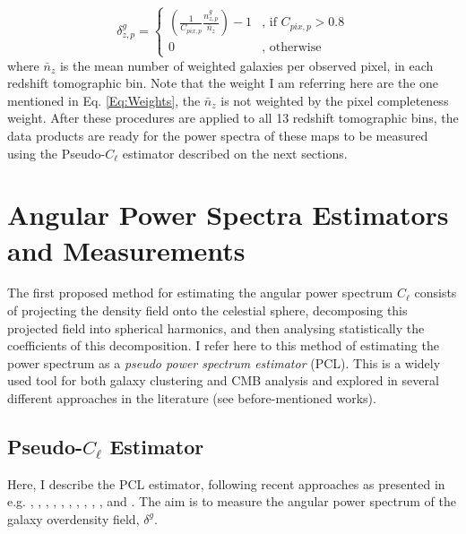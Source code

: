 \begin{equation}
\delta_{z,p}^g = 
\begin{cases}
\left(\frac{1}{C_{pix,p}}\frac{n^g_{z,p}}{\bar{n}_z}\right) - 1 & \text{, if } C_{pix,p} > 0.8 \\
0 & \text{, otherwise}
\end{cases}
\label{Eq:OverDMaps}
\end{equation}
where $\bar{n}_z$ is the mean number of weighted galaxies per observed pixel, in each redshift tomographic bin. Note that the weight I am referring here are the one mentioned in Eq. \ref{Eq:Weights}, the $\bar{n}_z$ is not weighted by the pixel completeness weight.  After these procedures are applied to all 13 redshift tomographic bins, the data products are ready for the power spectra of these maps to be measured using the Pseudo-$C_{\ell}$ estimator described on the next sections.

\section{Angular Power Spectra Estimators and Measurements}\label{Sec:Measurements}
The first proposed method for estimating the angular power spectrum $C_{\ell}$  \citep{Peebles1973} consists of projecting the density field onto the celestial sphere, decomposing this projected field into spherical harmonics, and then analysing statistically the coefficients of this decomposition. I refer here to this method of estimating the power spectrum as a \textit{pseudo power spectrum estimator} (PCL). This is a widely used tool for both galaxy clustering and CMB analysis and explored in several different approaches in the literature (see before-mentioned works).

\subsection{Pseudo-$C_{\ell}$ Estimator}\label{Ref:PCL}

Here, I describe the PCL estimator, following recent approaches as presented in e.g. \cite{ScharfLahav1992}, \cite{FisherLahav1994}, \cite{Wright1994}, \cite{2001Huterer}, \cite{PolSpice2001}, \cite{BlakeFerreira2004}, \cite{Blake2007}, \cite{Thomas2010Neutr}, \cite{Thomas2011b}, \cite{Thomas2011}, and \cite{Ho2012}. The aim is to measure the angular power spectrum of the galaxy overdensity field, $\delta^g$. 

